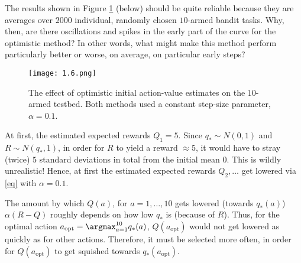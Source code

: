 
\begin{exercise}

The results shown in Figure \ref{fig:3} (below) should be quite reliable because they are averages over $2000$ individual, randomly chosen $10$-armed bandit tasks.
Why, then, are there oscillations and spikes in the early part of the curve for the optimistic method?
In other words, what might make this method perform particularly better or worse, on average, on particular early steps?

\begin{figure}[H]
    \centering
    \texttt{[image: 1.6.png]}
    \caption
    {
        The effect of optimistic initial action-value estimates on the $10$-armed testbed.
        Both methods used a constant step-size parameter, $\alpha = 0.1$.
    }
    \label{fig:3}
\end{figure}

\end{exercise}


\begin{solution}

At first, the estimated expected rewards $Q_1 = 5$.
Since $q_\ast \sim N(0, 1)$ and $R \sim N(q_\ast, 1)$, in order for $R$ to yield a reward $\approx 5$, it would have to stray (twice) $5$ standard deviations in total from the initial mean $0$.
This is wildly unrealistic!
Hence, at first the estimated expected rewards $Q_2, \dots$ get lowered via \eqref{eq} with $\alpha = 0.1$.

The amount by which $Q(a)$, for $a = 1, \dots, 10$ gets lowered (towards $q_\ast(a)$) $\alpha (R - Q)$ roughly depends on how low $q_\ast$ is (because of $R$).
Thus, for the optimal action $a_\text{opt} = \argmax_{a=1}^{10} q_\ast(a)$, $Q(a_\text{opt})$ would not get lowered as quickly as for other actions.
Therefore, it must be selected more often, in order for $Q(a_\text{opt})$ to get squished towards $q_\ast(a_\text{opt})$.

\end{solution}


